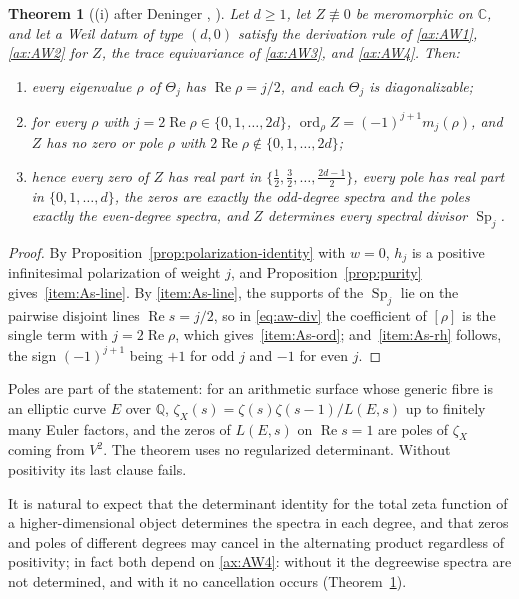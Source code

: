 \documentclass[11pt]{amsart}
\theoremstyle{plain}
\newtheorem{theorem}{Theorem}[section]
\theoremstyle{definition}
\theoremstyle{remark}
\numberwithin{equation}{section}
\newcommand{\C}{\mathbb{C}}
\newcommand{\Q}{\mathbb{Q}}
\DeclareMathOperator{\Rea}{Re}
\DeclareMathOperator{\ord}{ord}
\renewcommand{\Re}{\Rea}
\begin{document}
\begin{theorem}[{(i) after Deninger \cite[p.~172]{Deninger1998Analogies},
\cite[p.~5]{Deninger2010HilbertPolya}}]\label{thm:A-schemes}
Let $d\ge1$, let $Z\not\equiv0$ be meromorphic on $\C$, and let a Weil
datum of type $(d,0)$ satisfy the derivation rule of \ref{ax:AW1},
\ref{ax:AW2} for $Z$, the trace equivariance of \ref{ax:AW3}, and
\ref{ax:AW4}. Then:
\begin{enumerate}[label=(\roman*)]
\item\label{item:As-line} every eigenvalue $\rho$ of $\Theta_j$ has
  $\Re\rho=j/2$, and each $\Theta_j$ is diagonalizable;
\item\label{item:As-ord} for every $\rho$ with $j=2\Re\rho\in
  \{0,1,\dots,2d\}$, $\ord_\rho Z=(-1)^{j+1}m_j(\rho)$, and $Z$ has no
  zero or pole $\rho$ with $2\Re\rho\notin\{0,1,\dots,2d\}$;
\item\label{item:As-rh} hence every zero of $Z$ has real part in
  $\{\tfrac12,\tfrac32,\dots,\tfrac{2d-1}2\}$, every pole has real part
  in $\{0,1,\dots,d\}$, the zeros are exactly the odd-degree spectra and
  the poles exactly the even-degree spectra, and $Z$ determines every
  spectral divisor $\operatorname{Sp}_j$.
\end{enumerate}
\end{theorem}

\begin{proof}
By Proposition~\ref{prop:polarization-identity} with $w=0$, $h_j$ is a
positive infinitesimal polarization of weight $j$, and
Proposition~\ref{prop:purity} gives~\ref{item:As-line}. By
\ref{item:As-line}, the supports of the $\operatorname{Sp}_j$ lie on the
pairwise disjoint lines $\Re s=j/2$, so in \eqref{eq:aw-div} the
coefficient of $[\rho]$ is the single term with $j=2\Re\rho$, which
gives~\ref{item:As-ord}; and~\ref{item:As-rh} follows, the sign
$(-1)^{j+1}$ being $+1$ for odd $j$ and $-1$ for even $j$.
\end{proof}

Poles are part of the statement: for an arithmetic surface whose
generic fibre is an elliptic curve $E$ over $\Q$, $\zeta_X(s)=\zeta(s)
\zeta(s-1)/L(E,s)$ up to finitely many Euler factors, and the zeros of
$L(E,s)$ on $\Re s=1$ are poles of $\zeta_X$ coming from $V^2$. The
theorem uses no regularized determinant. Without positivity its last
clause fails.

It is natural to expect that the determinant identity for the total
zeta function of a higher-dimensional object determines the spectra in
each degree, and that zeros and poles of different degrees may cancel
in the alternating product regardless of positivity; in fact both
depend on \ref{ax:AW4}: without it the degreewise spectra are not
determined, and with it no cancellation occurs
(Theorem~\ref{thm:A-schemes}).
\end{document}

